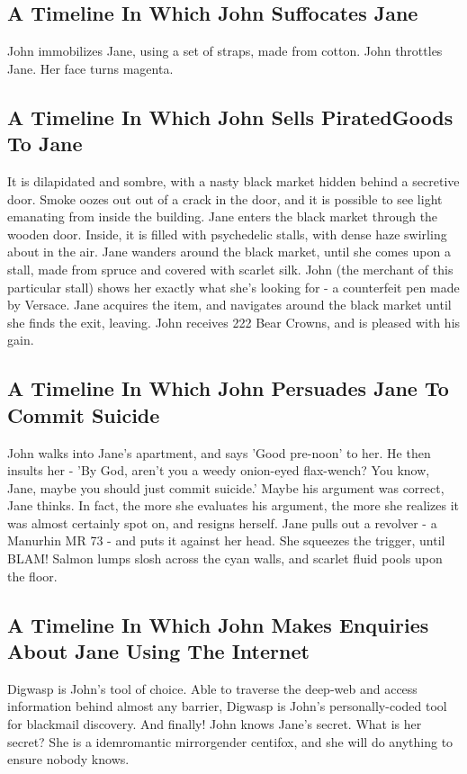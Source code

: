 \documentclass{article}
\begin{document}
\subsection{A Timeline In Which John Suffocates Jane}


John immobilizes Jane, using a set of straps, made from cotton.
John throttles Jane.
Her face turns magenta.
\subsection{A Timeline In Which John Sells PiratedGoods To Jane}


It is dilapidated and sombre, with a nasty black market hidden behind a secretive door.
Smoke oozes out out of a crack in the door, and it is possible to see light emanating from inside the building.
Jane enters the black market through the wooden door.
Inside, it is filled with psychedelic stalls, with dense haze swirling about in the air.
Jane wanders around the black market, until she comes upon a stall, made from spruce and covered with scarlet silk.
John (the merchant of this particular stall) shows her exactly what she's looking for {-} a counterfeit pen made by Versace.
Jane acquires the item, and navigates around the black market until she finds the exit, leaving.
John receives 222 Bear Crowns, and is pleased with his gain.
\subsection{A Timeline In Which John Persuades Jane To Commit Suicide}


John walks into Jane's apartment, and says 'Good pre{-}noon' to her.
He then insults her {-} 'By God, aren't you a weedy onion{-}eyed flax{-}wench?
You know, Jane, maybe you should just commit suicide.'
Maybe his argument was correct, Jane thinks.
In fact, the more she evaluates his argument, the more she realizes it was almost certainly spot on, and resigns herself.
Jane pulls out a revolver {-} a Manurhin MR 73 {-} and puts it against her head.
She squeezes the trigger, until BLAM!
Salmon lumps slosh across the cyan walls, and scarlet fluid pools upon the floor.
\subsection{A Timeline In Which John Makes Enquiries About Jane Using The Internet}


Digwasp is John's tool of choice. Able to traverse the deep{-}web and access information behind almost any barrier, Digwasp is John's personally{-}coded tool for blackmail discovery.
And finally!
John knows Jane's secret. What is her secret? She is a idemromantic mirrorgender centifox, and she will do anything to ensure nobody knows.
\end{document}
